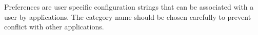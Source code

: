 Preferences are user specific configuration strings that can be associated with a user by applications. The category
name should be chosen carefully to prevent conflict with other applications.
